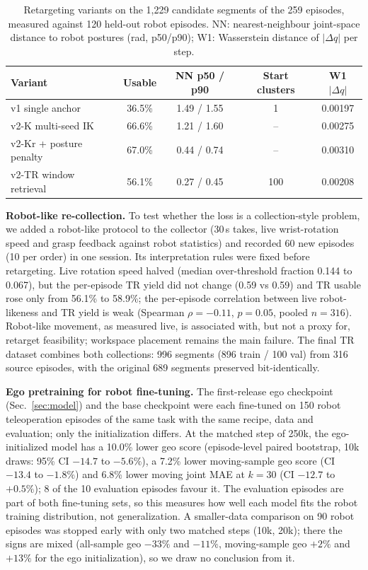 \documentclass[conference,10pt]{IEEEtran}
\begin{document}
\begin{table}[t]
\centering\footnotesize\setlength{\tabcolsep}{3.5pt}
\caption{Retargeting variants on the 1{,}229 candidate segments of the 259 episodes, measured against 120 held-out robot
episodes. NN: nearest-neighbour joint-space distance to robot postures (rad, p50/p90); W1: Wasserstein distance of
$|\Delta q|$ per step.}
\label{tab:retarget}
\begin{tabular}{@{}lcccc@{}}
\toprule
Variant & Usable & NN p50 / p90 & Start clusters & W1 $|\Delta q|$ \\
\midrule
v1 single anchor & 36.5\% & 1.49 / 1.55 & 1 & 0.00197 \\
v2-K multi-seed IK & 66.6\% & 1.21 / 1.60 & -- & 0.00275 \\
v2-Kr + posture penalty & 67.0\% & 0.44 / 0.74 & -- & 0.00310 \\
v2-TR window retrieval & 56.1\% & 0.27 / 0.45 & 100 & 0.00208 \\
\bottomrule
\end{tabular}
\end{table}

\textbf{Robot-like re-collection.} To test whether the loss is a collection-style problem, we added a robot-like protocol to
the collector (30\,s takes, live wrist-rotation speed and grasp feedback against robot statistics) and recorded 60 new
episodes (10 per order) in one session. Its interpretation rules were fixed before retargeting. Live rotation speed halved
(median over-threshold fraction 0.144 to 0.067), but the per-episode TR yield did not change (0.59 vs 0.59) and TR usable
rose only from 56.1\% to 58.9\%; the per-episode correlation between live robot-likeness and TR yield is weak
(Spearman $\rho=-0.11$, $p=0.05$, pooled $n=316$). Robot-like movement, as measured live, is associated with, but not a
proxy for, retarget feasibility; workspace placement remains the main failure. The final TR dataset combines both
collections: 996 segments (896 train / 100 val) from 316 source episodes, with the original 689 segments preserved
bit-identically.

\textbf{Ego pretraining for robot fine-tuning.} The first-release ego checkpoint (Sec.~\ref{sec:model}) and the base
checkpoint were each fine-tuned on 150 robot teleoperation episodes of the same task with the same recipe, data and
evaluation; only the initialization differs. At the matched step of 250k, the ego-initialized model has a 10.0\% lower geo
score (episode-level paired bootstrap, 10k draws: 95\% CI $-14.7$ to $-5.6\%$), a 7.2\% lower moving-sample geo score (CI
$-13.4$ to $-1.8\%$) and 6.8\% lower moving joint MAE at $k{=}30$ (CI $-12.7$ to $+0.5\%$); 8 of the 10 evaluation
episodes favour it. The evaluation episodes are part of both fine-tuning sets, so this measures how well each model fits
the robot training distribution, not generalization. A smaller-data comparison on 90 robot episodes was stopped early with
only two matched steps (10k, 20k); there the signs are mixed (all-sample geo $-33\%$ and $-11\%$, moving-sample geo $+2\%$ and
$+13\%$ for the ego initialization), so we draw no conclusion from it.
\end{document}
